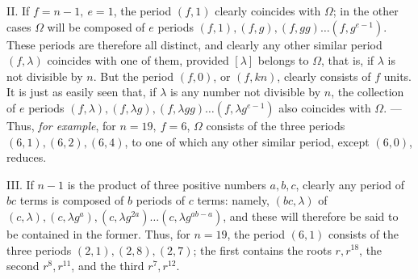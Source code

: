 II. If \(f=n-1,\allowbreak \ e=1\), the period \((f,\allowbreak 1)\) clearly coincides with \(\Omega\); in the other cases \(\Omega\) will be composed of \(e\) periods \((f,\allowbreak 1),\allowbreak (f,\allowbreak g),\allowbreak (f,\allowbreak gg)\ldots(f,\allowbreak g^{e-1})\). These periods are therefore all distinct, and clearly any other similar period \((f,\allowbreak \lambda)\) coincides with one of them, provided \([\lambda]\) belongs to \(\Omega\), that is, if \(\lambda\) is not divisible by \(n\). But the period \((f,\allowbreak 0)\), or \((f,\allowbreak kn)\), clearly consists of \(f\) units. It is just as easily seen
that, if \(\lambda\) is any number not divisible by \(n\), the collection of \(e\) periods \((f,\allowbreak \lambda),\allowbreak (f,\allowbreak \lambda g),\allowbreak (f,\allowbreak \lambda gg)\ldots(f,\allowbreak \lambda g^{e-1})\) also coincides with \(\Omega\). — Thus, \textit{for example}, for \(n=19,\allowbreak \ f=6\), \(\Omega\) consists of the three periods \((6,\allowbreak 1),\allowbreak (6,\allowbreak 2),\allowbreak (6,\allowbreak 4)\), to one of which any other similar period, except \((6,\allowbreak 0)\), reduces.

III. If \(n-1\) is the product of three positive numbers \(a,\allowbreak b,\allowbreak c\), clearly any period of \(bc\) terms is composed of \(b\) periods of \(c\) terms: namely, \((bc,\allowbreak \lambda)\) of \((c,\allowbreak \lambda),\allowbreak (c,\allowbreak \lambda g^a),\allowbreak (c,\allowbreak \lambda g^{2a})\ldots(c,\allowbreak \lambda g^{ab-a})\), and these will therefore be said to be contained in the former. Thus, for \(n=19\), the period \((6,\allowbreak 1)\) consists of the three periods \((2,\allowbreak 1),\allowbreak (2,\allowbreak 8),\allowbreak (2,\allowbreak 7)\); the first contains the roots \(r,\allowbreak r^{18}\), the second \(r^8,\allowbreak r^{11}\), and the third \(r^7,\allowbreak r^{12}\).

